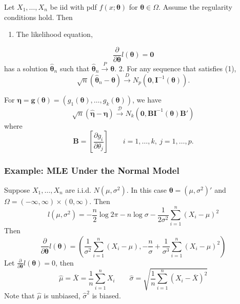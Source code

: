 \begin{theorem}
Let $X_1, \ldots, X_n$ be iid with pdf $f(x ; \boldsymbol{\theta})$ for $\boldsymbol{\theta} \in \Omega$. Assume the regularity conditions hold. Then
	\begin{enumerate}
		\item The likelihood equation,
	\end{enumerate}
\[
\frac{\partial}{\partial \boldsymbol{\theta}} l(\boldsymbol{\theta})=\mathbf{0}
\]has a solution $\widehat{\boldsymbol{\theta}}_n$ such that $\widehat{\boldsymbol{\theta}}_n \xrightarrow{P} \boldsymbol{\theta}$.
2. For any sequence that satisfies (1),
\[
\sqrt{n}\left(\widehat{\boldsymbol{\theta}}_n-\boldsymbol{\theta}\right) \xrightarrow{D} N_p\left(\mathbf{0}, \mathbf{I}^{-1}(\boldsymbol{\theta})\right) .
\]
\end{theorem}
For $\boldsymbol{\eta}=\mathbf{g}(\boldsymbol{\theta})=(g_1(\boldsymbol{\theta}),\dots,g_k(\boldsymbol{\theta}))$, we have
\[
\sqrt{ n }(\widehat{\boldsymbol{\eta}}-\boldsymbol{\eta})\overset{ \mathcal{D} }{ \to }N_k(\mathbf{0},\mathbf{B}\mathbf{I}^{-1}(\boldsymbol{\theta})\mathbf{B}')
\]
where
\[
\mathbf{B}=\left[ \frac{ \partial g_i }{ \partial \theta _j }  \right]\qquad i=1,\dots,k,\ j=1,\dots,p.
\]
\subsubsection{Example: MLE Under the Normal Model}

Suppose $X_1,\dots,X_n$ are i.i.d. $N(\mu,\sigma^{2})$. In this case $\boldsymbol{\theta}=(\mu,\sigma^{2})'$ and $\Omega=(-\infty,\infty)\times(0,\infty)$. Then
\[
l(\mu,\sigma^{2})=-\frac{n}{2}\log2\pi-n\log\sigma-\frac{1}{2\sigma^{2}}\sum_{i=1}^{n} (X_i-\mu)^2
\]
Then
\[
\frac{ \partial   }{ \partial \boldsymbol{\theta} } l(\boldsymbol{\theta})=\left( \frac{1}{\sigma^{2}}\sum_{i=1}^{n} (X_i-\mu),-\frac{n}{\sigma}+\frac{1}{\sigma^{3}}\sum_{i=1}^{n} (X_i-\mu)^2 \right)
\]
Let $\frac{ \partial   }{ \partial \boldsymbol{\theta} }l(\boldsymbol{\theta})=0$, then
\[
\widehat{\mu}=\overline{X}=\frac{1}{n}\sum_{i=1}^{n} X_i \qquad \widehat{\sigma}=\sqrt{ \frac{1}{n}\sum_{i=1}^{n} (X_i-\overline{X})^2 }
\]
Note that $\widehat{\mu}$ is unbiased, $\widehat{\sigma}^2$ is biased.
